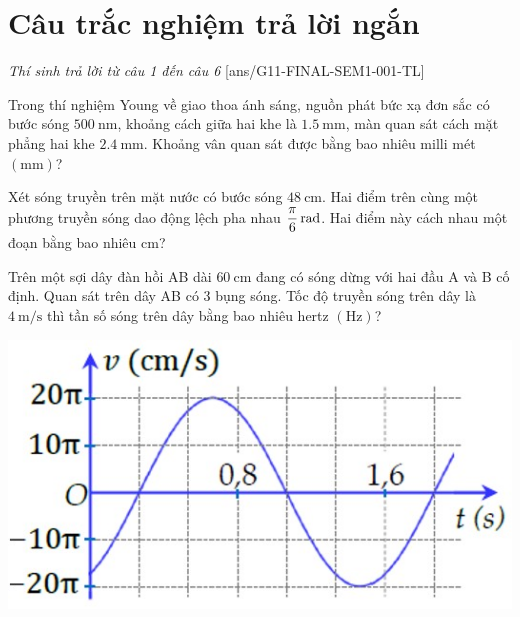 \section{Câu trắc nghiệm trả lời ngắn} \textit{Thí sinh trả lời từ câu 1 đến câu 6}
\setcounter{ex}{0}
[ans/G11-FINAL-SEM1-001-TL]
\begin{ex}
	Trong thí nghiệm Young về giao thoa ánh sáng, nguồn phát bức xạ đơn sắc có bước sóng $\SI{500}{\nano\meter}$, khoảng cách giữa hai khe là $\SI{1.5}{\milli\meter}$, màn quan sát cách mặt phẳng hai khe $\SI{2.4}{\milli\meter}$. Khoảng vân quan sát được bằng bao nhiêu milli mét $\left(\si{\milli\meter}\right)$? 
\end{ex}
\begin{ex}
	Xét sóng truyền trên mặt nước có bước sóng $\SI{48}{\centi\meter}$. Hai điểm trên cùng một phương truyền sóng dao động lệch pha nhau $\xsi{\dfrac{\pi}{6}}{\radian}$. Hai điểm này cách nhau một đoạn bằng bao nhiêu $\si{\centi\meter}$?
\end{ex}
\begin{ex}
	Trên một sợi dây đàn hồi AB dài $\SI{60}{\centi\meter}$ đang có sóng dừng với hai đầu A và B cố định. Quan sát trên dây AB có 3 bụng sóng. Tốc độ truyền sóng trên dây là $\SI{4}{\meter/\second}$ thì tần số sóng trên dây bằng bao nhiêu hertz $\left(\si{\hertz}\right)$? 
\end{ex}
\begin{ex}
	{\vspace{-0.5cm}\includegraphics[scale=0.5]{../figs/G11-FINAL-SEM1-001-4}}
\end{ex}
